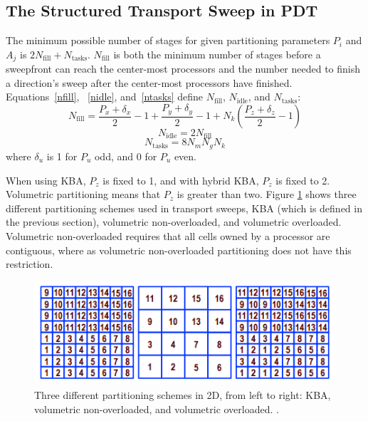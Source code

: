\documentclass{anstrans}
\begin{document}
\subsection{The Structured Transport Sweep in PDT}
The minimum possible number of stages for given partitioning parameters $P_i$ and $A_j$ is $2 N_{\text{fill}}+N_{\text{tasks}}$. $N_{\text{fill}}$ is both the minimum number of stages before a sweepfront can reach the center-most processors and the number needed to finish a direction's sweep after the center-most processors have finished. Equations~\eqref{nfill}, ~\eqref{nidle}, and~\eqref{ntasks} define $N_{\text{fill}}$, $N_{\text{idle}}$, and $N_{\text{tasks}}$:
\begin{equation}
N_{\text{fill}} = \frac{P_x + \delta_x}{2} - 1 + \frac{P_y + \delta_y}{2} - 1 + N_k (\frac{P_z + \delta_z}{2} - 1)
\label{nfill}
\end{equation}
\begin{equation}
N_{\text{idle}} = 2 N_{\text{fill}}
\label{nidle}
\end{equation}
\begin{equation}
N_{\text{tasks}} = 8 N_m N_g N_k
\label{ntasks}
\end{equation}
where $\delta_u$ is 1 for $P_u$ odd, and 0 for $P_u$ even.

When using KBA, $P_z$ is fixed to 1, and with hybrid KBA, $P_z$ is fixed to 2. Volumetric partitioning means that $P_z$ is greater than two. Figure \ref{partitioning} shows three different partitioning schemes used in transport sweeps, KBA (which is defined in the previous section), volumetric non-overloaded, and volumetric overloaded. Volumetric non-overloaded requires that all cells owned by a processor are contiguous, where as volumetric non-overloaded partitioning does not have this restriction.  

\begin{figure}
\centering
\includegraphics[scale = 0.75]{figures/Partitioning.png}
\caption{Three different partitioning schemes in 2D, from left to right: KBA, volumetric non-overloaded, and volumetric overloaded. \cite{mpadams2015}.}
\label{partitioning}
\end{figure}
\end{document}
